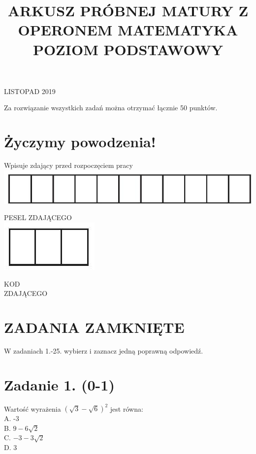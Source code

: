 \documentclass[10pt]{article}
\title{ARKUSZ PRÓBNEJ MATURY Z OPERONEM MATEMATYKA \\
 POZIOM PODSTAWOWY }
\author{}
\date{}
\begin{document}
\maketitle
LISTOPAD 2019

Za rozwiązanie wszystkich zadań można otrzymać łącznie 50 punktów.

\section*{Życzymy powodzenia!}
Wpisuje zdający przed rozpoczęciem pracy\\
\includegraphics[max width=\textwidth, center]{2024_11_21_e15da647cf0a41077ac3g-01}

PESEL ZDAJĄCEGO\\
\includegraphics[max width=\textwidth, center]{2024_11_21_e15da647cf0a41077ac3g-01(1)}

KOD\\
ZDAJĄCEGO

\section*{ZADANIA ZAMKNIĘTE}
W zadaniach 1.-25. wybierz i zaznacz jedną poprawną odpowiedź.

\section*{Zadanie 1. (0-1)}
Wartość wyrażenia \((\sqrt{3}-\sqrt{6})^{2}\) jest równa:\\
A. -3\\
B. \(9-6 \sqrt{2}\)\\
C. \(-3-3 \sqrt{2}\)\\
D. 3
\end{document}
